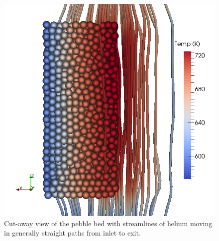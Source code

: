 \begin{figure}[t]
    \centering
    \includegraphics[width=\singleimagewidth]{chapters/figures/cfd-dem-streamlines2}
    \caption{Cut-away view of the pebble bed with streamlines of helium moving in generally straight paths from inlet to exit.}\label{fig:cfdem-streamlines}
\end{figure}


